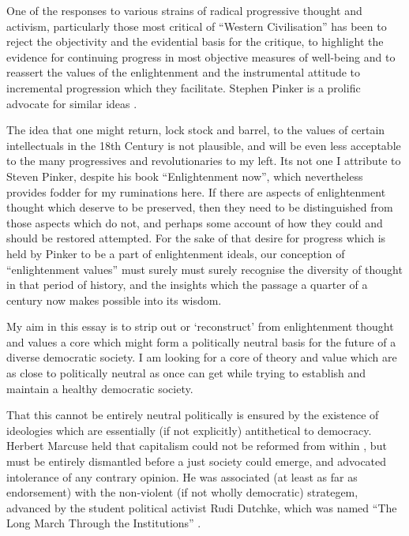 \documentclass[10pt,titlepage]{book}
\begin{document}
One of the responses to various strains of radical progressive thought and activism, particularly those most critical of ``Western Civilisation'' has been to reject the objectivity and the evidential basis for the critique, to highlight the evidence for continuing progress in most objective measures of well-being and to reassert the values of the enlightenment and the instrumental attitude to incremental progression which they facilitate.
Stephen Pinker is a prolific advocate for similar ideas \cite{pinker-angels,pinker-en}.

The idea that one might return, lock stock and barrel, to the values of certain intellectuals in the 18th Century is not plausible, and will be even less acceptable to the many progressives and revolutionaries to my left.
Its not one I attribute to Steven Pinker, despite his book ``Enlightenment now''\cite{pinker-en}, which nevertheless provides fodder for my ruminations here.
If there are aspects of enlightenment thought which deserve to be preserved, then they need to be distinguished from those aspects which do not, and perhaps some account of how they could and should be restored attempted.
For the sake of that desire for progress which is held by Pinker to be a part of enlightenment ideals, our conception of ``enlightenment values'' must surely must surely recognise the diversity of thought in that period of history, and the insights which the passage a quarter of a century now makes possible into its wisdom.

My aim in this essay is to strip out or `reconstruct' from enlightenment thought and values a core which might form a politically neutral basis for the future of a diverse democratic society.
I am looking for a core of theory and value which are as close to politically neutral as once can get while trying to establish and maintain a healthy democratic society.

That this cannot be entirely neutral politically is ensured by the existence of ideologies which are essentially (if not explicitly) antithetical to democracy.
Herbert Marcuse held that capitalism could not be reformed from within \cite{marcuse-repressive, marcuse-liberation}, but must be entirely dismantled before a just society could emerge, and advocated intolerance of any contrary opinion.
He was associated (at least as far as endorsement) with the non-violent (if not wholly democratic) strategem, advanced by the student political activist Rudi Dutchke, which was named ``The Long March Through the Institutions'' \cite{sidwell-long}.
\end{document}
